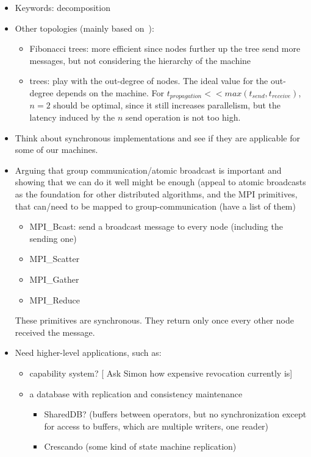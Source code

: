 \documentclass{article}
\newcommand{\stefan}[1]{
  {\color{skRed}[{\color{red}{SK}} #1]}}
\begin{document}
\begin{itemize}
\item Keywords: decomposition~\cite{Cavage2013}
\item Other topologies (mainly based on~\cite{Bruck1992}):
  \begin{itemize}
  \item Fibonacci trees: more efficient since nodes further up the
    tree send more messages, but not considering the hierarchy of the
    machine 
  \item \nary trees: play with the out-degree of nodes. The ideal
    value for the out-degree depends on the machine. For
    $t_{propagation} << max(t_{send}, t_{receive})$, $n = 2$ should be
    optimal, since it still increases parallelism, but the latency
    induced by the $n$ send operation is not too high.
  \end{itemize}
\item Think about synchronous implementations and see if they are
  applicable for some of our machines.
\item Arguing that group communication/atomic broadcast is important
  and showing that we can do it well might be enough (appeal to atomic
  broadcasts as the foundation for other distributed algorithms, and
  the MPI primitives, that can/need to be mapped to
  group-communication (have a list of them)
  \begin{itemize}
  \item MPI\_Bcast: send a broadcast message to every node (including
    the sending one)
  \item MPI\_Scatter
  \item MPI\_Gather
  \item MPI\_Reduce
  \end{itemize}
  These primitives are synchronous. They return only once every other
  node received the message. 
\item Need higher-level applications, such as:
  \begin{itemize}
  \item capability system? \stefan{Ask Simon how expensive revocation
      currently is}
  \item a database with replication and consistency maintenance
    \begin{itemize}
    \item SharedDB? (buffers between operators, but no synchronization
      except for access to buffers, which are multiple writers, one
      reader)
    \item Crescando (some kind of state machine replication)

\end{itemize}
\end{itemize}
\end{itemize}
\end{document}
